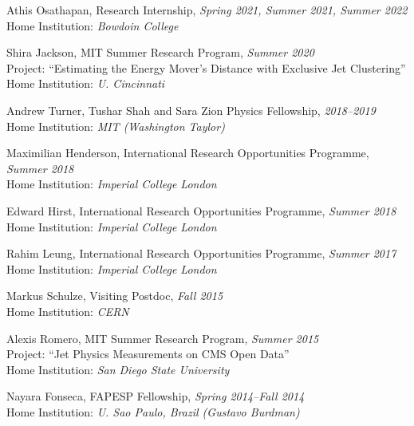 \item Athis Osathapan, Research Internship, \emph{Spring 2021, Summer 2021, Summer 2022}
\\ Home Institution: \emph{Bowdoin College}

\item Shira Jackson, MIT Summer Research Program, \emph{Summer 2020}
\\ Project: ``Estimating the Energy Mover’s Distance with Exclusive Jet Clustering''
\\ Home Institution: \emph{U. Cincinnati}

\item Andrew Turner, Tushar Shah and Sara Zion Physics Fellowship, \emph{2018--2019}
\\ Home Institution: \emph{MIT (Washington Taylor)}

\item Maximilian Henderson, International Research Opportunities Programme, \emph{Summer 2018}
\\ Home Institution: \emph{Imperial College London}

\item Edward Hirst, International Research Opportunities Programme, \emph{Summer 2018}
\\ Home Institution: \emph{Imperial College London}

\item Rahim Leung, International Research Opportunities Programme, \emph{Summer 2017}
\\ Home Institution: \emph{Imperial College London}

\item Markus Schulze, Visiting Postdoc, \emph{Fall 2015}
\\ Home Institution: \emph{CERN}

\item Alexis Romero, MIT Summer Research Program, \emph{Summer 2015}
\\ Project: ``Jet Physics Measurements on CMS Open Data''
\\ Home Institution: \emph{San Diego State University}

\item Nayara Fonseca, FAPESP Fellowship, \emph{Spring 2014--Fall 2014}
\\ Home Institution: \emph{U. Sao Paulo, Brazil (Gustavo Burdman)}

\el
